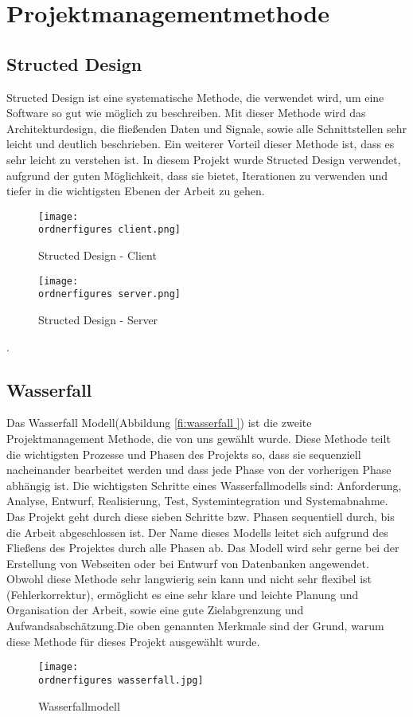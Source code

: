 \section{Projektmanagementmethode}

\subsection{Structed Design}
Structed Design ist eine systematische Methode, die verwendet wird, um eine Software so gut wie m\"{o}glich zu beschreiben. Mit dieser Methode wird das Architekturdesign, die flie\ss{}enden Daten und Signale, sowie alle Schnittstellen sehr leicht und deutlich beschrieben. Ein weiterer Vorteil dieser Methode ist, dass es sehr leicht zu verstehen ist. In diesem Projekt wurde Structed Design verwendet, aufgrund der guten M\"{o}glichkeit, dass sie bietet, Iterationen zu verwenden und tiefer in die wichtigsten Ebenen der Arbeit zu gehen. 

\label{fi:sd-client }

\begin{figure}[h]
	\centering
	\texttt{[image: \\ordnerfigures
		client.png]}
	\caption{Structed Design - Client}
\end{figure}

\label{fi:sd-server }

\begin{figure}[h]
	\centering
	\texttt{[image: \\ordnerfigures
		server.png]}
	\caption{Structed Design - Server}
\end{figure}


.\subsection{Wasserfall}
Das Wasserfall Modell(Abbildung \ref{fi:wasserfall }) ist die zweite Projektmanagement Methode, die von uns gew\"{a}hlt wurde. Diese Methode teilt die wichtigsten Prozesse und Phasen des Projekts so, dass sie sequenziell nacheinander bearbeitet werden und dass jede Phase von der vorherigen Phase abh\"{a}ngig ist. Die wichtigsten Schritte eines Wasserfallmodells sind: Anforderung, Analyse, Entwurf, Realisierung, Test, Systemintegration und Systemabnahme. Das Projekt geht durch diese sieben Schritte bzw. Phasen sequentiell durch, bis die Arbeit abgeschlossen ist. Der Name dieses Modells leitet sich aufgrund des Flie\ss{}ens des Projektes durch alle Phasen ab.  Das Modell wird sehr gerne bei der Erstellung von Webseiten oder bei Entwurf von Datenbanken angewendet. Obwohl diese Methode sehr langwierig sein kann und nicht sehr flexibel ist (Fehlerkorrektur), erm\"{o}glicht es eine sehr klare und leichte Planung und Organisation der Arbeit, sowie eine gute Zielabgrenzung und Aufwandsabsch\"{a}tzung.Die oben genannten Merkmale sind der Grund, warum diese Methode f\"{u}r dieses Projekt ausgew\"{a}hlt wurde. 

\label{fi:wasserfall }

\begin{figure}[h]
	\centering
	\texttt{[image: \\ordnerfigures
		wasserfall.jpg]}
	\caption{Wasserfallmodell}
\end{figure}



